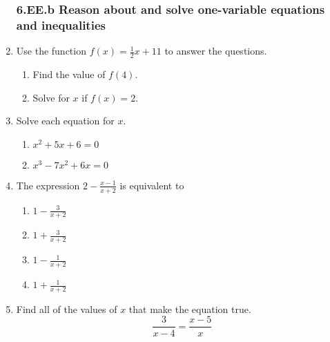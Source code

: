 \documentclass[12pt, twoside]{article}
\begin{document}
\begin{enumerate}[itemsep=0.5cm]
\newpage
\subsubsection*{6.EE.b Reason about and solve one-variable equations and inequalities}

\item Use the function $f(x) = \frac{1}{2}x + 11$ to answer the questions.
    \begin{multicols}{2}
    \begin{enumerate}[itemsep=2cm]
        \item Find the value of $f(4)$.
        \item Solve for $x$ if $f(x) = 2$.
    \end{enumerate}
    \end{multicols} \vspace{2cm}

    
\item Solve each equation for $x$.
\begin{multicols}{2}
    \begin{enumerate}
    \item $x^2+5x+6 = 0$
    \item $x^3-7x^2+6x = 0$ 
    \end{enumerate} 
\end{multicols} \vspace{3cm}

\item The expression $\displaystyle 2 - \frac{x - 1}{x + 2}$ is equivalent to 
\begin{multicols}{2}
    \begin{enumerate}
    \item $\displaystyle 1 - \frac{3}{x + 2}$
    \item $\displaystyle 1 + \frac{3}{x + 2}$ 
    \item $\displaystyle 1 - \frac{1}{x + 2}$
    \item $\displaystyle 1 + \frac{1}{x + 2}$ 
    \end{enumerate} 
\end{multicols} 

\item Find all of the values of $x$ that make the equation true. 
$$\frac{3}{x-4} = \frac{x-5}{x}$$ \vspace{4cm}

\newpage
      

\end{enumerate}
\end{document}
